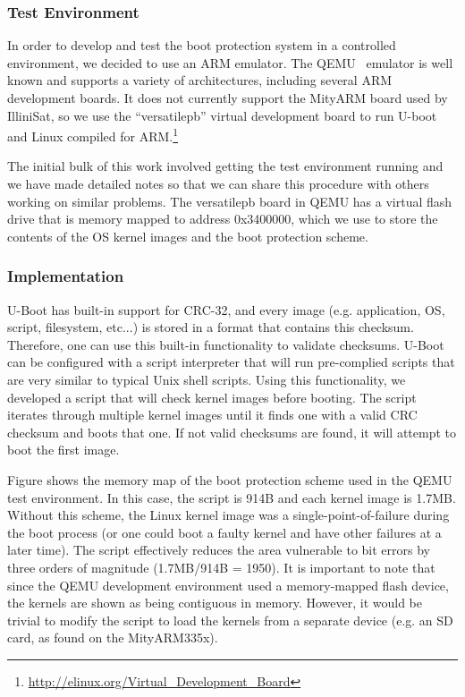 \subsubsection{Test Environment}
In order to develop and test the boot protection system in a controlled
environment, we decided to use an ARM emulator.  The QEMU~\cite{bellard2005qemu}
emulator is well known and supports a variety of architectures, including
several ARM development boards.  It does not currently support the MityARM board
used by IlliniSat, so we use the ``versatilepb'' virtual development board to
run U-boot and Linux compiled for
ARM.\footnote{\url{http://elinux.org/Virtual_Development_Board}}

The initial bulk of this work involved getting the test environment running and
we have made detailed notes so that we can share this procedure with others
working on similar problems.  The versatilepb board in QEMU has a virtual flash
drive that is memory mapped to address 0x3400000, which we use to store the
contents of the OS kernel images and the boot protection scheme.

\subsubsection{Implementation}
U-Boot has built-in support for CRC-32, and every image (e.g. application, OS,
script, filesystem, etc...) is stored in a format that contains this checksum.
Therefore, one can use this built-in functionality to validate checksums.
U-Boot can be configured with a script interpreter that will run pre-complied
scripts that are very similar to typical Unix shell scripts. Using this
functionality, we developed a script that will check kernel images before
booting. The script iterates through multiple kernel images until it finds one
with a valid CRC checksum and boots that one.  If not valid checksums are found,
it will attempt to boot the first image.  

Figure \label{fig:mem_map} shows the memory map of the boot protection scheme
used in the QEMU test environment.  In this case, the script is 914B and each
kernel image is 1.7MB.  Without this scheme, the Linux kernel image was a
single-point-of-failure during the boot process (or one could boot a faulty
kernel and have other failures at a later time).  The script effectively reduces
the area vulnerable to bit errors by three orders of magnitude (1.7MB/914B =
1950).  It is important to note that since the QEMU development environment used
a memory-mapped flash device, the kernels are shown as being contiguous in
memory.  However, it would be trivial to modify the script to load the kernels
from a separate device (e.g. an SD card, as found on the MityARM335x).


